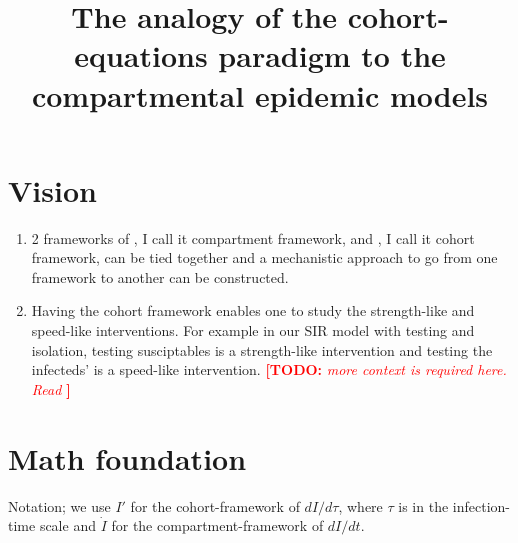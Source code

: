 \documentclass[12pt]{article}
\title{The analogy of the cohort-equations paradigm to the compartmental epidemic models}
\newcommand{\todo}[1]{\comment{red}{TODO}{#1}}
\DeclareRobustCommand\_{\ifmmode\expandafter\subtxt\else\textunderscore\fi}
\newcommand{\comment}{\showcomment}
\newcommand{\showcomment}[3]{\textcolor{#1}{\textbf{[#2: }\textsl{#3}\textbf{]}}}
\theoremstyle{definition} %
\begin{document}
\maketitle
\linenumbers
\section{Vision}
\begin{enumerate}
\item 2 frameworks of \cite{van2002reproduction}, I call it compartment framework, and \cite{champredon2018equivalence}, I call it cohort framework, can be tied together and a mechanistic approach to go from one framework to another can be constructed.

\item Having the cohort framework enables one to study the strength-like and speed-like interventions. For example in our SIR model with testing and isolation, testing susciptables is a strength-like intervention and testing the infecteds' is a speed-like intervention. \todo{more context is required here. Read \cite{diekmann1990definition}}
\end{enumerate}

\section{Math foundation}
Notation; we use $I'$ for the cohort-framework of $dI/d\tau$, where $\tau$ is in the infection-time scale and $\dot I$ for the compartment-framework of $dI/dt$. 
\end{document}
